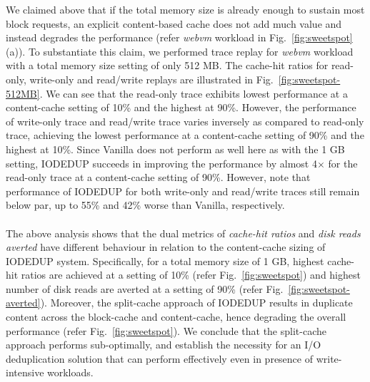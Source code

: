 We claimed above that if the total memory
size is already enough to sustain most block requests,
an explicit content-based cache does not add much value
and instead degrades the performance (refer
\textit{webvm} workload in Fig.~\ref{fig:sweetspot}(a)).
To substantiate this claim, we performed trace replay for \textit{webvm}
workload with a total memory size setting of only 512 MB. The cache-hit
ratios for read-only, write-only
and read/write replays are illustrated in Fig.~\ref{fig:sweetspot-512MB}.
We can see that the read-only trace exhibits
lowest performance at a content-cache setting of 10\% and the highest
at 90\%. However, the performance of write-only trace and read/write trace
varies inversely as compared to read-only trace, achieving the lowest
performance at a content-cache setting of 90\% and the highest
at 10\%.
Since Vanilla does not perform as well here as with the 1 GB
setting, IODEDUP succeeds in improving the performance by
almost 4$\times$ for the read-only trace
at a content-cache setting of 90\%. However, note that performance of
IODEDUP for both write-only and read/write traces still remain below par,
up to 55\% and 42\% worse than Vanilla, respectively.
\\
\\
The above analysis shows that the dual metrics of \textit{cache-hit
ratios} and \textit{disk reads averted} have different behaviour in relation to the
content-cache sizing of IODEDUP system. Specifically,
for a total memory size of 1 GB,
highest cache-hit
ratios are achieved at a setting of 10\% (refer Fig.~\ref{fig:sweetspot})
and highest number of disk reads
are averted at a setting of 90\% (refer Fig.~\ref{fig:sweetspot-averted}).
Moreover,
the split-cache approach of IODEDUP results in duplicate content across the
block-cache and content-cache, hence degrading the overall performance
(refer Fig.~\ref{fig:sweetspot}).
We conclude that the split-cache approach
performs sub-optimally, and establish the necessity
for an I/O deduplication solution that can perform effectively
even in presence of write-intensive workloads.

